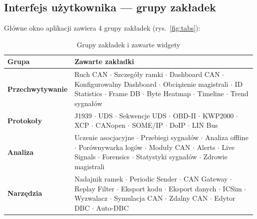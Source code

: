 \documentclass[12pt, a4paper]{article}
\begin{document}
\subsection{Interfejs użytkownika --- grupy zakładek}

Główne okno aplikacji zawiera 4 grupy zakładek (rys.~\ref{fig:tabs}):

\begin{table}[H]
\caption{Grupy zakładek i zawarte widgety}
\label{tab:tabs}
\centering
\small
\begin{tabular}{p{3.5cm}p{9.5cm}}
\toprule
\textbf{Grupa} & \textbf{Zawarte zakładki} \\
\midrule
\textbf{Przechwytywanie} &
  Ruch CAN $\cdot$ Szczegóły ramki $\cdot$ Dashboard CAN $\cdot$
  Konfigurowalny Dashboard $\cdot$ Obciążenie magistrali $\cdot$
  ID Statistics $\cdot$ Frame DB $\cdot$ Byte Heatmap $\cdot$
  Timeline $\cdot$ Trend sygnałów \\
\textbf{Protokoły} &
  J1939 $\cdot$ UDS $\cdot$ Sekwencje UDS $\cdot$ OBD-II $\cdot$
  KWP2000 $\cdot$ XCP $\cdot$ CANopen $\cdot$ SOME/IP $\cdot$
  DoIP $\cdot$ LIN Bus \\
\textbf{Analiza} &
  Uczenie asocjacyjne $\cdot$ Przebiegi sygnałów $\cdot$
  Analiza offline $\cdot$ Porównywarka logów $\cdot$
  Moduły CAN $\cdot$ Alerts $\cdot$ Live Signals $\cdot$
  Forensics $\cdot$ Statystyki sygnałów $\cdot$ Zdrowie magistrali \\
\textbf{Narzędzia} &
  Nadajnik ramek $\cdot$ Periodic Sender $\cdot$ CAN Gateway $\cdot$
  Replay Filter $\cdot$ Eksport kodu $\cdot$ Eksport danych $\cdot$
  ICSim $\cdot$ Wyzwalacz $\cdot$ Symulacja CAN $\cdot$
  Zdalny CAN $\cdot$ Edytor DBC $\cdot$ Auto-DBC \\
\bottomrule
\end{tabular}
\end{table}
\end{document}
